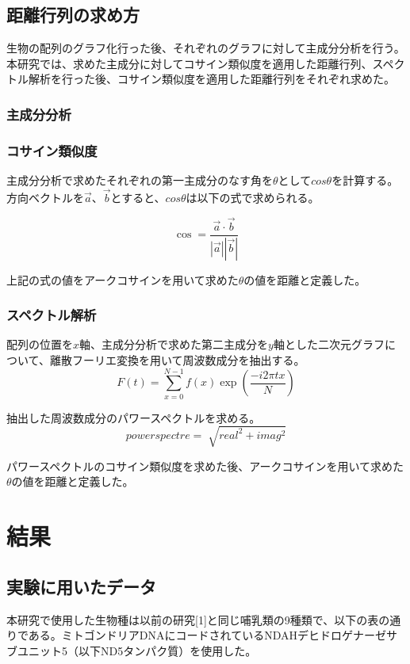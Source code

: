 \documentclass[twocolumn,paper=a4paper,landscape,fontsize=9pt]{jlreq}
\begin{document}
\subsection{距離行列の求め方}
生物の配列のグラフ化行った後、それぞれのグラフに対して主成分分析を行う。本研究では、求めた主成分に対してコサイン類似度を適用した距離行列、スペクトル解析を行った後、コサイン類似度を適用した距離行列をそれぞれ求めた。

\subsubsection{主成分分析}

\subsubsection{コサイン類似度}
主成分分析で求めたそれぞれの第一主成分のなす角を$θ$として$cosθ$を計算する。方向ベクトルを$\vec{a}$、$\vec{b}$とすると、$cosθ$は以下の式で求められる。

\begin{equation}
\cos = \frac{\vec{a}\cdot\vec{b}}{|\vec{a}||\vec{b}|}
\end{equation}

上記の式の値をアークコサインを用いて求めた$θ$の値を距離と定義した。

\subsubsection{スペクトル解析}
配列の位置を$x$軸、主成分分析で求めた第二主成分を$y$軸とした二次元グラフについて、離散フーリエ変換を用いて周波数成分を抽出する。
\begin{equation}
F(t) =\sum^{N-1}_{x = 0}f(x)\exp(\frac{-i2\pi tx}{N})
\end{equation}

抽出した周波数成分のパワースペクトルを求める。
\begin{equation}
power spectre = \sqrt[]{real^2+imag^2}
\end{equation}

パワースペクトルのコサイン類似度を求めた後、アークコサインを用いて求めた$θ$の値を距離と定義した。

\section{結果}
\subsection{実験に用いたデータ}
本研究で使用した生物種は以前の研究[1]と同じ哺乳類の9種類で、以下の表の通りである。ミトゴンドリアDNAにコードされているNDAHデヒドロゲナーゼサブユニット5（以下ND5タンパク質）を使用した。
\end{document}
